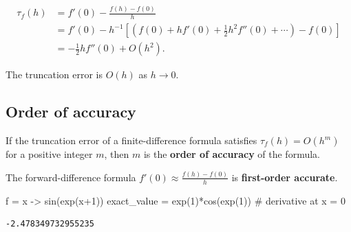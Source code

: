 \documentclass[
]{article}
\newenvironment{Shaded}{\begin{snugshade}}{\end{snugshade}}
\newcommand{\CommentTok}[1]{\textcolor[rgb]{0.37,0.37,0.37}{#1}}
\newcommand{\FloatTok}[1]{\textcolor[rgb]{0.68,0.00,0.00}{#1}}
\newcommand{\FunctionTok}[1]{\textcolor[rgb]{0.28,0.35,0.67}{#1}}
\newcommand{\NormalTok}[1]{\textcolor[rgb]{0.00,0.23,0.31}{#1}}
\newcommand{\OperatorTok}[1]{\textcolor[rgb]{0.37,0.37,0.37}{#1}}
\begin{document}
\[\begin{align*}
\tau_f(h) &= f'(0) - \frac{f(h) - f(0)}{h}
\\&= f'(0) - h^{-1}\left[\left(f(0) + h f'(0) + \frac12 h^2 f''(0) + \cdots\right) - f(0)\right]
\\&= -\frac12 h f''(0) + O(h^2).
\end{align*}\]

The truncation error is \(O(h)\) as \(h \rightarrow 0\).

\subsection{Order of accuracy}\label{order-of-accuracy}

\begin{tcolorbox}[enhanced jigsaw, left=2mm, arc=.35mm, leftrule=.75mm, colbacktitle=quarto-callout-note-color!10!white, coltitle=black, toptitle=1mm, bottomtitle=1mm, colback=white, colframe=quarto-callout-note-color-frame, opacityback=0, breakable, titlerule=0mm, title={Definition: Order of accuracy of a finite-difference formula}, rightrule=.15mm, bottomrule=.15mm, toprule=.15mm, opacitybacktitle=0.6]

If the truncation error of a finite-difference formula satisfies
\(\tau_f(h) = O(h^m)\) for a positive integer \(m\), then \(m\) is the
\textbf{order of accuracy} of the formula.

\end{tcolorbox}

The forward-difference formula \(f'(0) \approx \frac{f(h) - f(0)}{h}\)
is \textbf{first-order accurate}.

\begin{Shaded}
\begin{Highlighting}[]
\NormalTok{f }\OperatorTok{=}\NormalTok{ x }\OperatorTok{{-}\textgreater{}} \FunctionTok{sin}\NormalTok{(}\FunctionTok{exp}\NormalTok{(x}\OperatorTok{+}\FloatTok{1}\NormalTok{))}
\NormalTok{exact\_value }\OperatorTok{=} \FunctionTok{exp}\NormalTok{(}\FloatTok{1}\NormalTok{)}\FunctionTok{*cos}\NormalTok{(}\FunctionTok{exp}\NormalTok{(}\FloatTok{1}\NormalTok{))  }\CommentTok{\# derivative at x = 0}
\end{Highlighting}
\end{Shaded}

\begin{verbatim}
-2.478349732955235
\end{verbatim}
\end{document}
